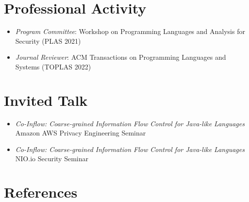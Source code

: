 \documentclass[11pt]{article}
\begin{document}



\section{Professional Activity}
\begin{itemize}
  \item \emph{Program Committee}: Workshop on Programming Languages and Analysis for Security (PLAS 2021)
\item \emph{Journal Reviewer}: ACM Transactions on Programming Languages and Systems (TOPLAS 2022)
\end{itemize}

\section{Invited Talk}


\begin{itemize}
\item \emph{Co-Inflow: Coarse-grained Information Flow Control for Java-like Languages} \\
  Amazon AWS Privacy Engineering Seminar
  

\item   \emph{Co-Inflow: Coarse-grained Information Flow Control for Java-like Languages} \\
  NIO.io Security Seminar 

\end{itemize}

\renewcommand{\emph}[1]{\textit{\textbf{#1}}}
\section{References}
\end{document}
